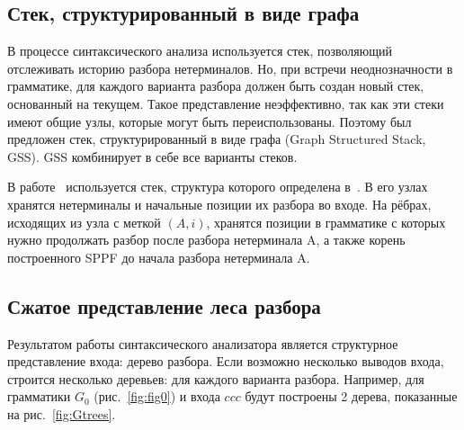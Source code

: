 \documentclass[14pt]{matmex-diploma-custom}
\begin{document}
	\subsection{Стек, структурированный в виде графа}
	В процессе синтаксического анализа используется стек, позволяющий отслеживать историю 
	разбора нетерминалов. Но, при встречи неоднозначности в грамматике, для каждого варианта 
    разбора должен быть создан новый стек, основанный на текущем. Такое представление неэффективно, так как эти стеки имеют общие узлы,
    которые могут быть переиспользованы. Поэтому был предложен стек, структурированный в виде графа
    (Graph Structured Stack, GSS). GSS комбинирует в себе все варианты стеков.
    
    В работе~\cite{ragozina} используется стек, структура которого определена в~\cite{afroozeh2015faster}.
    В его узлах хранятся нетерминалы и начальные позиции их разбора во входе.
    На рёбрах, исходящих из узла с меткой $(A, i)$, хранятся позиции в грамматике с которых нужно
    продолжать разбор после разбора нетерминала A, а также корень построенного SPPF до начала 
    разбора нетерминала A.
    
	\subsection{Сжатое представление леса разбора}
	Результатом работы синтаксического анализатора является структурное представление
    входа: дерево разбора. Если возможно несколько выводов входа, строится несколько деревьев:
    для каждого варианта разбора. Например, для грамматики $G_0$ (рис.~\ref{fig:fig0}) и входа $ccc$
    будут построены 2 дерева, показанные на рис.~\ref{fig:Gtrees}.
    
\end{document}
